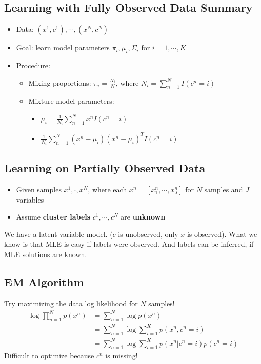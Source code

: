 \documentclass[10pt]{article}
\begin{document}
\subsection*{Learning with Fully Observed Data Summary}
\begin{itemize}
	\item Data: $(x^1, c^1), \cdots, (x^N, c^N)$
	\item Goal: learn model parameters $\pi_i, \mu_i, \Sigma_i$ for $i = 1, \cdots, K$
    \item Procedure:
    \begin{itemize}
	    \item Mixing proportions: $\pi_i = \frac{N_i}{N}$, where $N_i = \sum_{n = 1}^N I(c^n = i)$
	    \item Mixture model parameters:
	    \begin{itemize}
	        \item $\mu_i = \frac{1}{N_i} \sum_{n = 1}^N x^n I(c^n = i)$
	        \item $\frac{1}{N_i} \sum_{n = 1}^N (x^n - \mu_i)(x^n - \mu_i)^T I(c^n = i)$
        \end{itemize}
    \end{itemize}
\end{itemize}

\subsection*{Learning on Partially Observed Data}
\begin{itemize}
	\item Given samples $x^1, \cdot, x^N$, where each $x^n = [x_1^n, \cdots, x_J^n]$ for $N$ samples and $J$ variables
	\item Assume \textbf{cluster labels} $c^1, \cdots, c^N$ are \textbf{unknown}
\end{itemize}
We have a latent variable model.  ($c$ is unobserved, only $x$ is observed).  What we know is that MLE is easy if labels were observed.  And labels can be inferred, if MLE solutions are known.

\subsection*{EM Algorithm}
Try maximizing the data log likelihood for $N$ samples!
\begin{align*}
    \log \prod_{n = 1}^N p(x^n) &= \sum_{n = 1}^N \log p(x^n) \\
    &= \sum_{n = 1}^N \log \sum_{i = 1}^K p(x^n, c^n = i) \\
    &= \sum_{n = 1}^N \log \sum_{i = 1}^K p(x^n | c^n = i) p(c^n = i)
\end{align*}
Difficult to optimize because $c^n$ is missing!
\end{document}
